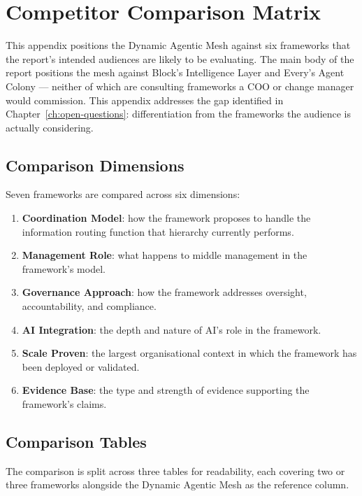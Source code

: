 \chapter{Competitor Comparison Matrix}
\label{ch:competitor-matrix}

This appendix positions the Dynamic Agentic Mesh against six frameworks that the report's intended audiences are likely to be evaluating. The main body of the report positions the mesh against Block's Intelligence Layer and Every's Agent Colony --- neither of which are consulting frameworks a COO or change manager would commission. This appendix addresses the gap identified in Chapter~\ref{ch:open-questions}: differentiation from the frameworks the audience is actually considering.

\section{Comparison Dimensions}

Seven frameworks are compared across six dimensions:

\begin{enumerate}
  \item \textbf{Coordination Model}: how the framework proposes to handle the information routing function that hierarchy currently performs.
  \item \textbf{Management Role}: what happens to middle management in the framework's model.
  \item \textbf{Governance Approach}: how the framework addresses oversight, accountability, and compliance.
  \item \textbf{AI Integration}: the depth and nature of AI's role in the framework.
  \item \textbf{Scale Proven}: the largest organisational context in which the framework has been deployed or validated.
  \item \textbf{Evidence Base}: the type and strength of evidence supporting the framework's claims.
\end{enumerate}

\section{Comparison Tables}

The comparison is split across three tables for readability, each covering two or three frameworks alongside the Dynamic Agentic Mesh as the reference column.

